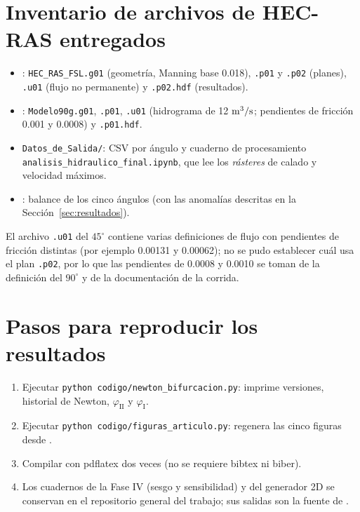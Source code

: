 \section{Inventario de archivos de HEC-RAS entregados}
\begin{itemize}
\item {}: \texttt{HEC\_RAS\_FSL.g01} (geometría, Manning base 0.018), \texttt{.p01} y \texttt{.p02} (planes), \texttt{.u01} (flujo no permanente) y \texttt{.p02.hdf} (resultados).
\item {}: \texttt{Modelo90g.g01}, \texttt{.p01}, \texttt{.u01} (hidrograma de 12 $\mathrm{m^3/s}$; pendientes de fricción 0.001 y 0.0008) y \texttt{.p01.hdf}.
\item \texttt{Datos\_de\_Salida/}: CSV por ángulo y cuaderno de procesamiento \texttt{analisis\_hidraulico\_final.ipynb}, que lee los \emph{rásteres} de calado y velocidad máximos.
\item {}: balance de los cinco ángulos (con las anomalías descritas en la Sección~\ref{sec:resultados}).
\end{itemize}
El archivo \texttt{.u01} del $45^\circ$ contiene varias definiciones de flujo con pendientes de fricción distintas (por ejemplo 0.00131 y 0.00062); no se pudo establecer cuál usa el plan \texttt{.p02}, por lo que las pendientes de 0.0008 y 0.0010 se toman de la definición del $90^\circ$ y de la documentación de la corrida.

\section{Pasos para reproducir los resultados}
\begin{enumerate}
\item Ejecutar \texttt{python codigo/newton\_bifurcacion.py}: imprime versiones, historial de Newton, $\varphi_{\mathrm{II}}$ y $\varphi_{\mathrm I}$.
\item Ejecutar \texttt{python codigo/figuras\_articulo.py}: regenera las cinco figuras desde .
\item Compilar  con pdflatex dos veces (no se requiere bibtex ni biber).
\item Los cuadernos de la Fase IV (sesgo y sensibilidad) y del generador 2D se conservan en el repositorio general del trabajo; sus salidas son la fuente de .
\end{enumerate}
